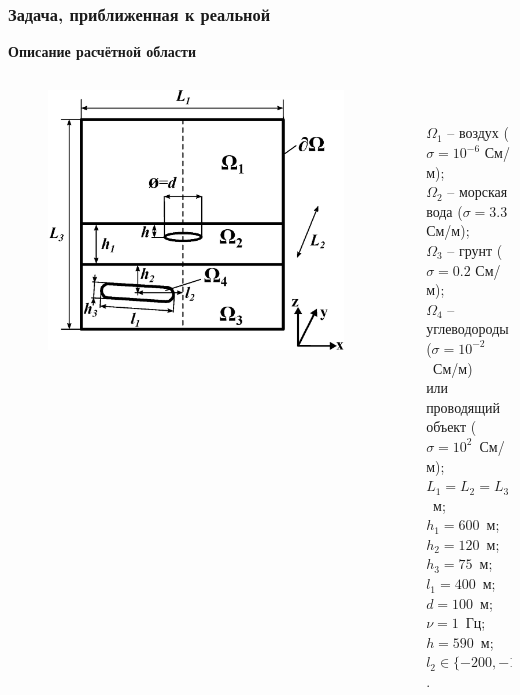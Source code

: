 \documentclass[aspectratio=43]{beamer}
\newcommand{\MakeTitle}[1]{\frametitle{\hspace{1.5em}\textbf{#1} \hfill \insertframenumber{} }}
\begin{document}
\begin{frame}
	\MakeTitle{Задача, приближенная к реальной}
	\textbf{Описание расчётной области}
	\begin{columns}[t,totalwidth=\linewidth]
		\hspace{-0.07\linewidth}
		\begin{column}{.5\linewidth}
			\vspace{-3em}
			\begin{figure}[ht]
				\includegraphics[width=1.1\textwidth,height=1.1\textheight,keepaspectratio]{area_3layers_shift_3_waterloop.eps}
			\end{figure}
		\end{column}
		\begin{column}{.04\linewidth}
		\end{column}
		\begin{column}{.8\linewidth}
			\\
			\begin{small}
			$\Omega_1$ -- воздух ($\sigma=10^{-6}$ См/м); \\
			$\Omega_2$ -- морская вода ($\sigma=3.3$ См/м); \\
			$\Omega_3$ -- грунт ($\sigma=0.2$ См/м); \\
			$\Omega_4$ -- углеводороды ($\sigma=10^{-2}$~См/м) \\
			или проводящий объект ($\sigma=10^{2}$~См/м); \\
			$L_1 = L_2 = L_3 = 6000$~м; \\
			$h_1=600$~м; $h_2=120$~м; \\
			$h_3=75$~м; $l_1=400$~м; \\
			$d=100$~м; $\nu=1$~Гц; $h=590$~м; \\
			$l_2 \in \{ -200, -100, 0 \}$.
			\end{small}
		\end{column}
	\end{columns}
\end{frame}
\end{document}
